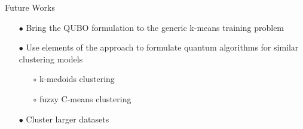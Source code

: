 	\begin{frame}{Future Works}
		\begin{itemize}
			\item[$\bullet$] Bring the QUBO formulation to the generic k-means training problem
			\item[$\bullet$] Use elements of the approach to formulate quantum algorithms for similar clustering models
			\begin{itemize}
				\item[$\circ$] k-medoids clustering
				\item[$\circ$] fuzzy C-means clustering
			\end{itemize}
			\item[$\bullet$] Cluster larger datasets 
		\end{itemize}
	\end{frame}

